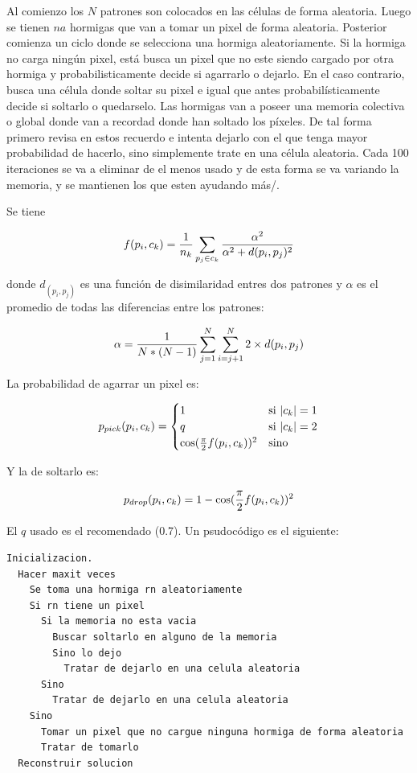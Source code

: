 Al comienzo los $N$ patrones son colocados
en las c\'elulas de forma aleatoria. Luego se tienen $na$ hormigas que van a tomar
un pixel de forma aleatoria. Posterior comienza un ciclo donde se selecciona una hormiga
aleatoriamente. Si la hormiga no carga ning\'un pixel, est\'a busca un pixel
que no este siendo cargado por otra hormiga y probabilisticamente decide si agarrarlo o dejarlo.
En el caso contrario, busca una c\'elula donde soltar su pixel e igual que antes
probabil\'isticamente decide si soltarlo o quedarselo. Las hormigas van a poseer
una memoria colectiva o global donde van a recordad donde han soltado los p\'ixeles.
De tal forma primero revisa en estos recuerdo e intenta dejarlo con el que tenga 
mayor probabilidad de hacerlo, sino simplemente trate en una c\'elula
aleatoria. Cada 100 iteraciones se va a eliminar de
el menos usado y de esta forma se va variando la memoria, y se mantienen los que
esten ayudando m\'as/.

Se tiene

\[
f(p_i,c_k) = {1 \over n_k} \sum_{p_j \in c_k} {\alpha^2 \over {\alpha^2 + d(p_i,p_j)^2}}
\]

donde $d_(p_i,p_j)$ es una funci\'on de disimilaridad
entres dos patrones y $\alpha$ es el promedio de todas
las diferencias entre los patrones:

\[
\alpha = {1 \over {N*(N-1)}} \sum_{j=1}^N \sum_{i=j+1}^N {2 \times d(p_i,p_j)}
\]

La probabilidad de agarrar un pixel es:

\[
p_{pick}(p_i,c_k) = 
\begin{cases}
1 & \text{si } |c_k| = 1 \\
q & \text{si } |c_k| = 2 \\
\cos( {\pi \over 2} f(p_i, c_k) )^2  & \text {sino}
\end{cases}
\]

Y la de soltarlo es:

\[
p_{drop}(p_i,c_k) = 1 - \cos( {\pi \over 2} f(p_i, c_k) )^2 
\]

El $q$ usado es el recomendado (0.7). Un psudoc\'odigo es
el siguiente:

\begin{lstlisting}[mathescape, language=Pascal]
  Inicializacion.
  Hacer maxit veces
    Se toma una hormiga rn aleatoriamente
	Si rn tiene un pixel
	  Si la memoria no esta vacia
	    Buscar soltarlo en alguno de la memoria
		Sino lo dejo
		  Tratar de dejarlo en una celula aleatoria
	  Sino
	    Tratar de dejarlo en una celula aleatoria
	Sino
	  Tomar un pixel que no cargue ninguna hormiga de forma aleatoria
	  Tratar de tomarlo
  Reconstruir solucion
\end{lstlisting}

